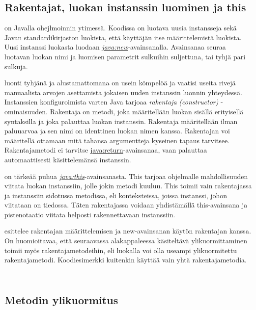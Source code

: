\documentclass{tufte-book}
\newcommand{\eng}[1]{\textit{(#1)}}
\newcommand{\new}[1]{\textit{\gls{#1}}}
\newcommand{\neweng}[2]{\new{#1} \eng{#2}}
\newcommand{\java}[1]{\underline{\gls{java:#1}}}
\newcommand{\newjava}[1]{\textit{\java{#1}}}
\newcommand{\code}[3]{
\begin{listing}
    \inputminted{java}{OhjelmointiopasEsimerkit/src/#1/#2.java}
    \caption{#3}
    \label{Java-#1-#2}
\end{listing}
}
\begin{document}
\subsection{Rakentajat, luokan instanssin luominen ja this}
\label{new this}

 on Javalla ohejlmoinnin ytimessä. Koodissa on luotava uusia
instansseja sekä Javan standardikirjaston luokista, että käyttäjän itse määrittelemistä luokista.
Uusi instanssi luokasta luodaan \newjava{new}-avainsanalla. Avainsanaa seuraa luotavan luokan
nimi ja luomisen parametrit sulkuihin suljettuna, tai tyhjä pari sulkuja.

 luonti tyhjänä ja alustamattomana on usein kömpelöä ja vaatisi
useita rivejä manuaalista arvojen asettamista jokaisen uuden instanssin luonnin yhteydessä.
Instanssien konfiguroimista varten Java tarjoaa \neweng{rakentaja}{constructor} -ominaisuuden.
Rakentaja on metodi, joka määritellään luokan sisällä erityisellä syntaksilla ja joka palauttaa
luokan instanssin. Rakentaja määritellään ilman paluuarvoa ja sen nimi on identtinen luokan nimen
kanssa. Rakentajan voi määritellä ottamaan mitä tahansa argumentteja kyseinen tapaus tarvitsee.
Rakentajametodi ei tarvitse \java{return}-avainsanaa, vaan palauttaa automaattisesti
käsittelemänsä instanssin.

 on tärkeää puhua \newjava{this}-avainsanasta. This tarjoaa
ohjelmalle mahdollisuuden viitata luokan instanssiin, jolle jokin metodi kuuluu. This toimii
vain rakentajassa ja instanssiin sidotussa metodissa, eli konteksteissa, joissa instanssi, johon
viitataan on tiedossa. Täten rakentajassa voidaan yhdistämällä this-avainsana ja pistenotaatio
viitata helposti rakennettavaan instanssiin.

 esittelee rakentajan määrittelemisen ja new-avainsanan
käytön rakentajan kanssa. On huomioitavaa, että seuraavassa alakappaleessa käsiteltävä
ylikuormittaminen toimii myös rakentajametodeihin, eli luokalla voi olla useampi ylikuormitettu
rakentajametodi. Koodiesimerkki kuitenkin käyttää vain yhtä rakentajametodia.

\code{week2/constructorexample}{ClassWithConstructor}{Rakentajan luonti Javassa}
\code{week2/constructorexample}{Main}{\java{new}-avainsanan käyttö}


\subsection{Metodin ylikuormitus}
\label{overloading}
\end{document}
